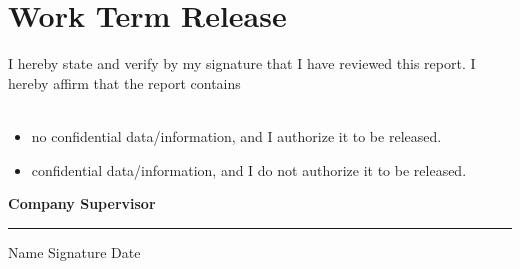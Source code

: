 
\section*{Work Term Release}


\vspace{0.4cm}
\large \noindent
I hereby state and verify by my signature that I have reviewed this report. I hereby affirm that the report contains \\
\vspace{0.2cm} \\
\begin{itemize}
\item[$\square$] no confidential data/information, and I authorize it to be released.
\vspace{0.3cm}
\item[$\square$] confidential data/information, and I do not authorize it to be released.
\end{itemize}
\textbf{\large{Company Supervisor}}
\normalsize
\vspace{1cm}

\vspace{0.2cm}
\hrule
\vspace{0.2cm}
\noindent Name \hspace{7cm} Signature \hspace{3cm} Date
